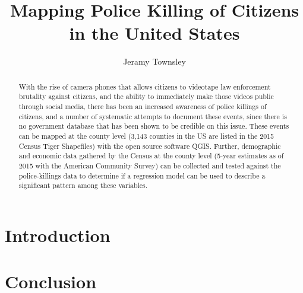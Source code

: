 \documentclass[sigconf]{acmart}
\begin{document}
\title{Mapping Police Killing of Citizens in the United States}

\author{Jeramy Townsley}


\begin{abstract}
With the rise of camera phones that allows citizens to videotape law enforcement brutality against citizens, and the ability to immediately make those videos public through social media, there has been an increased awareness of police killings of citizens, and a number of systematic attempts to document these events, since there is no government database that has been shown to be credible on this issue. These events can be mapped at the county level (3,143 counties in the US are listed in the 2015 Census Tiger Shapefiles) with the open source software QGIS.  Further, demographic and economic data gathered by the Census at the county level (5-year estimates as of 2015 with the American Community Survey) can be collected and tested against the police-killings data to determine if a regression model can be used to describe a significant pattern among these variables. 
\end{abstract}


\maketitle

\section{Introduction}

\section{Conclusion}

 
\end{document}
